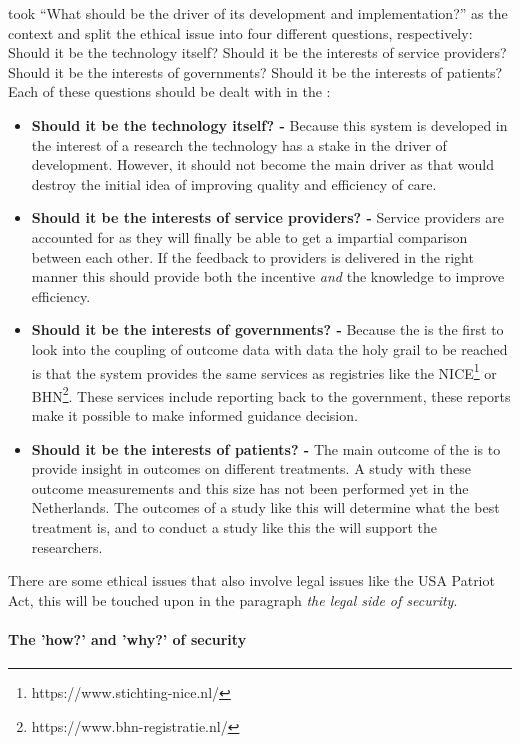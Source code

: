 \cite{s7Kluge2007} took ``What should be the driver of its development and implementation?'' as the context and split the ethical issue into four different questions, respectively: Should it be the technology itself? Should it be the interests of service providers? Should it be the interests of governments? Should it be the interests of patients?
Each of these questions should be dealt with in the \project{}:

\begin{itemize}
	\item \textbf{Should it be the technology itself? -} Because this system is developed in the interest of a research the technology has a stake in the driver of development.
	However, it should not become the main driver as that would destroy the initial idea of improving quality and efficiency of care.
	\item \textbf{Should it be the interests of service providers? -} Service providers are accounted for as they will finally be able to get a impartial comparison between each other.
	If the feedback to providers is delivered in the right manner this should provide both the incentive \emph{and} the knowledge to improve efficiency.
	\item \textbf{Should it be the interests of governments? -} Because the \project{} is the first to look into the coupling of outcome data with \IVF{} data the holy grail to be reached is that the system provides the same services as registries like the NICE\footnote{https://www.stichting-nice.nl/} or  BHN\footnote{https://www.bhn-registratie.nl/}.
	These services include reporting back to the government, these reports make it possible to make informed guidance decision.
	\item \textbf{Should it be the interests of patients? -} The main outcome of the \project{} is to provide insight in outcomes on different \IVF{} treatments.
	A study with these outcome measurements and this size has not been performed yet in the Netherlands.
	The outcomes of a study like this will determine what the best treatment is, and to conduct a study like this the \ivfsystem{} will support the researchers.
\end{itemize}

There are some ethical issues that also involve legal issues like the USA Patriot Act, this will be touched upon in the paragraph \emph{the legal side of security}.

\paragraph{The 'how?' and 'why?' of security}
\label{security-how-why}


